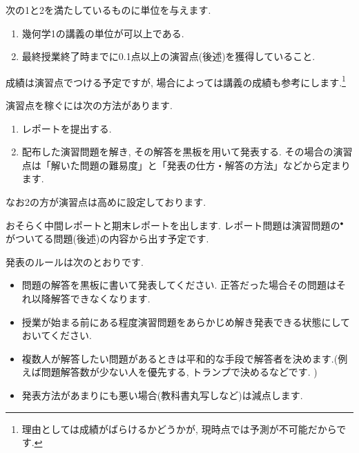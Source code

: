 \documentclass[dvipdfmx,a4paper,11pt]{article}
\theoremstyle{definition}
\begin{document}
次の1と2を満たしているものに単位を与えます.
\begin{enumerate}
  \setlength{\parskip}{0cm} %
  \setlength{\itemsep}{0cm} %
\item 幾何学1の講義の単位が可以上である.
\item 最終授業終了時までに0.1点以上の演習点(後述)を獲得していること.
\end{enumerate}
成績は演習点でつける予定ですが, 場合によっては講義の成績も参考にします.\footnote{理由としては成績がばらけるかどうかが, 現時点では予測が不可能だからです. }

\medskip
{}

演習点を稼ぐには次の方法があります.
\begin{enumerate}
  \setlength{\parskip}{0cm} 
  \setlength{\itemsep}{0cm} 
\item レポートを提出する.  %
\item 配布した演習問題を解き, その解答を黒板を用いて発表する. その場合の演習点は「解いた問題の難易度」と「発表の仕方・解答の方法」などから定まります.
\end{enumerate}

なお2の方が演習点は高めに設定しております.


\medskip
{}

おそらく中間レポートと期末レポートを出します. レポート問題は演習問題の$^{\bullet}$がついてる問題(後述)の内容から出す予定です.

\newpage
{}

\hspace{-18pt}発表のルールは次のとおりです.
\begin{itemize}
  \setlength{\parskip}{0cm} 
  \setlength{\itemsep}{0cm} 
\item 問題の解答を黒板に書いて発表してください. 正答だった場合その問題はそれ以降解答できなくなります. %
\item  授業が始まる前にある程度演習問題をあらかじめ解き発表できる状態にしておいてください.
\item 複数人が解答したい問題があるときは平和的な手段で解答者を決めます.(例えば問題解答数が少ない人を優先する, トランプで決めるなどです. )
\item 発表方法があまりにも悪い場合(教科書丸写しなど)は減点します.
\end{itemize}
\end{document}
